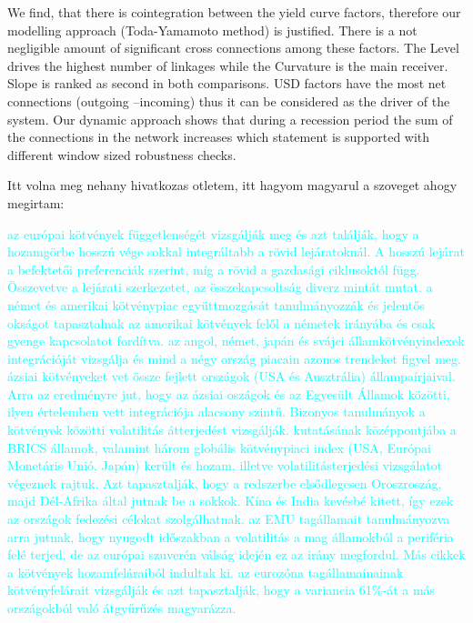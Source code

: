 \documentclass[12pt,bibliography=totoc]{article}
\begin{document}
We find, that there is cointegration between the yield curve factors, therefore our modelling approach (Toda-Yamamoto method) is justified. There is a not negligible amount of significant cross connections among these factors. The Level drives the highest number of linkages while the Curvature is the main receiver. Slope is ranked as second in both comparisons. USD factors have the most net connections (outgoing –incoming) thus it can be considered as the driver of the system. Our dynamic approach shows that during a recession period the sum of the connections in the network increases which statement is supported with different window sized robustness checks.


\bigskip{}
Itt volna meg nehany hivatkozas otletem, itt hagyom magyarul a szoveget ahogy megirtam:
\bigskip{}


\textcolor{cyan}{\cite{yang2016interdependence} az európai kötvények függetlenségét vizsgálják meg és azt találják, hogy a hozamgörbe hosszú vége sokkal integráltabb a rövid lejáratoknál. A hosszú lejárat a befektetői preferenciák szerint, míg a rövid a gazdasági ciklusoktól függ. Összevetve a lejárati szerkezetet, az összekapcsoltság diverz mintát mutat.
\cite{engsted2007comovement} a német és amerikai kötvénypiac együttmozgását tanulmányozzák és jelentős okságot tapasztalnak az amerikai kötvények felől a németek irányába és csak gyenge kapcsolatot fordítva.
\cite{davies2007international} az angol, német, japán és svájci államkötvényindexek integrációját vizsgálja és mind a négy ország piacain azonos trendeket figyel meg.
\cite{vo2009international} ázsiai kötvényeket vet össze fejlett országok (USA és Ausztrália) állampaírjaival. Arra az eredményre jut, hogy az ázsiai oszágok és az Egyesült Államok közötti, ilyen értelemben vett integrációja alacsony szintű.
Bizonyos tanulmányok a kötvények közötti volatilitás átterjedést vizsgálják. 
\cite{ahmad2018financial} kutatásának középpontjába a BRICS államok, valamint három globális kötvénypiaci index (USA, Európai Monetáris Unió, Japán) került és hozam, illetve volatilitásterjedési vizsgálatot végeznek rajtuk. Azt tapasztalják, hogy a redszerbe elsődlegesen Oroszroszág, majd Dél-Afrika által jutnak be a sokkok. Kína és India kevésbé kitett, így ezek az országok fedezési célokat szolgálhatnak.
\cite{fernandez2016using} az EMU tagállamait tanulmányozva arra jutnak, hogy nyugodt időszakban a volatilitás a mag államokból a periféria felé terjed, de az európai szuverén válság idején ez az irány megfordul.
Más cikkek a kötvények hozamfeláraiból indultak ki. 
\cite{antonakakis2013sovereign} az eurozóna tagállamainainak kötvényfelárait vizsgálják és azt tapasztalják, hogy a variancia 61\%-át a más országokból való átgyűrűzés magyarázza. 
}
\end{document}
